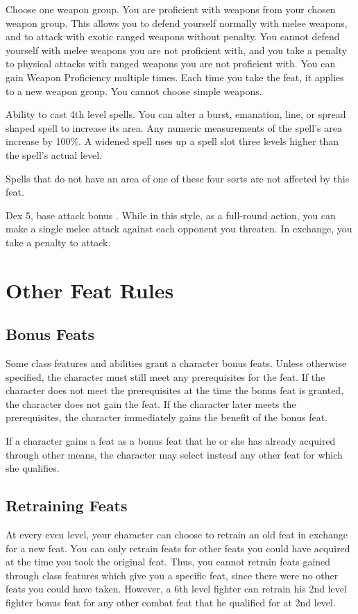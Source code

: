 Choose one weapon group.
 You are proficient with weapons from your chosen weapon group. This allows you to defend yourself normally with melee weapons, and to attack with exotic ranged weapons without penalty.
 You cannot defend yourself with melee weapons you are not proficient with, and you take a  penalty to physical attacks with ranged weapons you are not proficient with.
 You can gain Weapon Proficiency multiple times. Each time you take the feat, it applies to a new weapon group. You cannot choose simple weapons.

 Ability to cast 4th level spells.
 You can alter a burst, emanation, line, or spread shaped spell to increase its area. Any numeric measurements of the spell's area increase by 100\%. A widened spell uses up a spell slot three levels higher than the spell's actual level.
\par Spells that do not have an area of one of these four sorts are not affected by this feat.

 Dex 5, base attack bonus .
 While in this style, as a full-round action, you can make a single melee attack against each opponent you threaten. In exchange, you take a  penalty to attack.

\section{Other Feat Rules}

\subsection{Bonus Feats}
Some class features and abilities grant a character bonus feats. Unless otherwise specified, the character must still meet any prerequisites for the feat. If the character does not meet the prerequisites at the time the bonus feat is granted, the character does not gain the feat. If the character later meets the prerequisites, the character immediately gains the benefit of the bonus feat.

If a character gains a feat as a bonus feat that he or she has already acquired through other means, the character may select instead any other feat for which she qualifies.

\subsection{Retraining Feats}
At every even level, your character can choose to retrain an old feat in exchange for a new feat. You can only retrain feats for other feats you could have acquired at the time you took the original feat. Thus, you cannot retrain feats gained through class features which give you a specific feat, since there were no other feats you could have taken. However, a 6th level fighter can retrain his 2nd level fighter bonus feat for any other combat feat that he qualified for at 2nd level.

